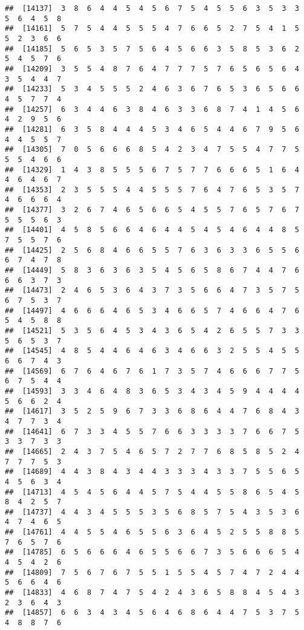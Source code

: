 \documentclass[
]{book}
\begin{document}
\begin{verbatim}
##  [14137]  3  8  6  4  4  5  4  5  6  7  5  4  5  5  6  3  5  3  3  5  6  4  5  8
##  [14161]  5  7  5  4  4  5  5  5  4  7  6  6  5  2  7  5  4  1  5  5  2  3  6  6
##  [14185]  5  6  5  3  5  7  5  6  4  5  6  6  3  5  8  5  3  6  2  5  4  5  7  6
##  [14209]  3  5  5  4  8  7  6  4  7  7  7  5  7  6  5  6  5  6  4  3  5  4  4  7
##  [14233]  5  3  4  5  5  5  2  4  6  3  6  7  6  5  3  6  5  6  6  4  5  7  7  4
##  [14257]  6  3  4  4  6  3  8  4  6  3  3  6  8  7  4  1  4  5  6  4  2  9  5  6
##  [14281]  6  3  5  8  4  4  4  5  3  4  6  5  4  4  6  7  9  5  6  4  4  5  5  7
##  [14305]  7  0  5  6  6  6  8  5  4  2  3  4  7  5  5  4  7  7  5  5  5  4  6  6
##  [14329]  1  4  3  8  5  5  5  6  7  5  7  7  6  6  6  5  1  6  4  4  6  4  6  7
##  [14353]  2  3  5  5  5  4  4  5  5  5  7  6  4  7  6  5  3  5  7  4  6  6  6  4
##  [14377]  3  2  6  7  4  6  5  6  6  5  4  5  5  7  6  5  7  6  7  5  5  5  6  3
##  [14401]  4  5  8  5  6  6  4  6  4  4  5  4  5  4  6  4  4  8  5  7  5  5  7  6
##  [14425]  2  5  6  8  4  6  6  5  5  7  6  3  6  3  3  6  5  5  6  6  7  4  7  8
##  [14449]  5  8  3  6  3  6  3  5  4  5  6  5  8  6  7  4  4  7  6  6  6  3  7  3
##  [14473]  2  4  6  5  3  6  4  3  7  3  5  6  6  4  7  3  5  7  5  6  7  5  3  7
##  [14497]  4  6  6  6  4  6  5  3  4  6  6  5  7  4  6  6  4  7  6  5  4  5  8  8
##  [14521]  5  3  5  6  4  5  3  4  3  6  5  4  2  6  5  5  7  3  3  5  6  5  3  7
##  [14545]  4  8  5  4  4  6  4  6  3  4  6  6  3  2  5  5  4  5  5  6  6  7  4  3
##  [14569]  6  7  6  4  6  7  6  1  7  3  5  7  4  6  6  6  7  7  5  6  7  5  4  4
##  [14593]  3  3  4  6  4  8  3  6  5  3  4  3  4  5  9  4  4  4  4  5  6  6  2  4
##  [14617]  3  5  2  5  9  6  7  3  3  6  8  6  4  4  7  6  8  4  3  4  7  7  3  4
##  [14641]  6  7  3  3  4  5  5  7  6  6  3  3  3  3  7  6  6  7  5  3  3  7  3  3
##  [14665]  2  4  3  7  5  4  6  5  7  2  7  7  6  8  5  8  5  2  4  7  7  7  5  3
##  [14689]  4  4  3  8  4  3  4  4  3  3  3  4  3  3  7  5  5  6  5  4  5  6  3  4
##  [14713]  4  5  4  5  6  4  4  5  7  5  4  4  5  5  8  6  5  4  5  8  4  2  5  7
##  [14737]  4  4  3  4  5  5  5  3  5  6  8  5  7  5  4  3  5  3  6  4  7  4  6  5
##  [14761]  4  4  5  5  4  6  5  5  6  3  6  4  5  2  5  5  8  8  5  7  6  5  7  6
##  [14785]  6  5  6  6  6  4  6  5  5  6  6  7  3  5  6  6  6  5  4  4  5  4  2  6
##  [14809]  7  5  6  7  6  7  5  5  1  5  5  4  5  7  4  7  2  4  4  5  6  6  4  6
##  [14833]  4  6  8  7  4  7  5  4  2  4  3  6  5  8  8  4  5  4  3  2  3  6  4  3
##  [14857]  6  6  3  4  3  4  5  6  4  6  8  6  4  4  7  5  3  7  5  4  8  8  7  6

\end{verbatim}
\end{document}
